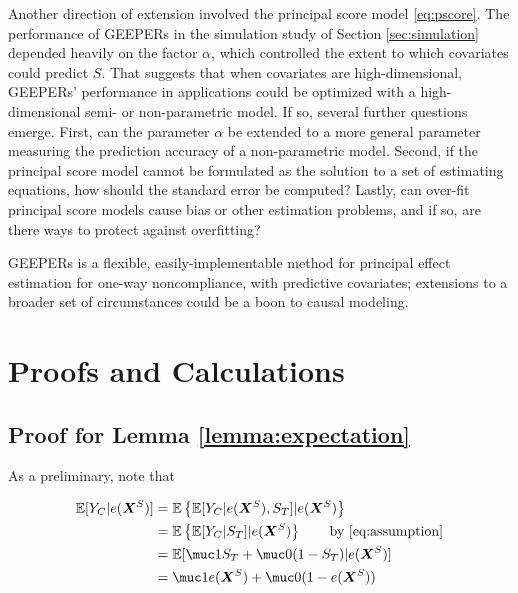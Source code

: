\documentclass{statsoc} %
\begin{document}
Another direction of extension involved the principal score model \eqref{eq:pscore}.
The performance of GEEPERs in the simulation study of Section \ref{sec:simulation} depended heavily on the factor $\alpha$, which controlled the extent to which covariates could predict $S$.
That suggests that when covariates are high-dimensional, GEEPERs' performance in applications could be optimized with a high-dimensional semi- or non-parametric model.
If so, several further questions emerge.
First, can the parameter $\alpha$ be extended to a more general parameter measuring the prediction accuracy of a non-parametric model.
Second, if the principal score model cannot be formulated as the solution to a set of estimating equations, how should the standard error be computed?
Lastly, can over-fit principal score models cause bias or other estimation problems, and if so, are there ways to protect against overfitting?

GEEPERs is a flexible, easily-implementable method for principal effect estimation for one-way noncompliance, with predictive covariates; extensions to a broader set of circumstances could be a boon to causal modeling.



\appendix

\section{Proofs and Calculations}
\subsection{Proof for Lemma \ref{lemma:expectation}}
As a preliminary, note that

\begin{align*}
  \EE[Y_C|\pp]&=\EE\left\{\EE[Y_C|\pp,\st]|\pp\right\}\\
             &=\EE\left\{\EE[Y_C|\st]|\pp\right\}\tag*{by \eqref{eq:assumption}}\\
             &=\EE[\muc1\st+\muc0(1-\st)|\pp]\\
             &=\muc1\pp+\muc0(1-\pp)
\end{align*}
\end{document}
